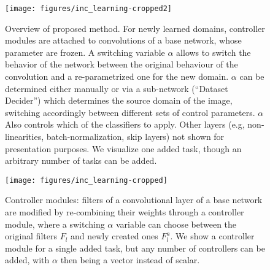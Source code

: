 \documentclass[10pt,journal,compsoc]{IEEEtran}
\begin{document}
\IEEEdisplaynontitleabstractindextext



\IEEEpeerreviewmaketitle




\begin{figure*}
\texttt{[image: figures/inc\_learning-cropped2]}

\caption{\label{fig:Summary-of-proposed} Overview of proposed method. For
newly learned domains, controller modules are attached to convolutions
of a base network, whose parameter are frozen. A switching variable
$\alpha$ allows to switch the behavior of the network between the
original behaviour of the convolution and a re-parametrized one for
the new domain. $\alpha$ can be determined either manually or via
a sub-network (``Dataset Decider'') which determines the source
domain of the image, switching accordingly between different sets
of control parameters. $\alpha$ Also controls which of the classifiers
to apply. Other layers (e.g, non-linearities, batch-normalization,
skip layers) not shown for presentation purposes. We visualize one
added task, though an arbitrary number of tasks can be added.}
\end{figure*}

\begin{figure}
\begin{centering}
\texttt{[image: figures/inc\_learning-cropped]}
\par\end{centering}
\caption{\label{fig:Controller-modules}Controller modules: filters of a convolutional
layer of a base network are modified by re-combining their weights
through a controller module, where a switching $\alpha$ variable
can choose between the original filters $F_{l}$ and newly created
ones $F_{l}^{a}$. We show a controller module for a single added
task, but any number of controllers can be added, with $\alpha$ then
being a vector instead of scalar. }

\end{figure}
\end{document}
